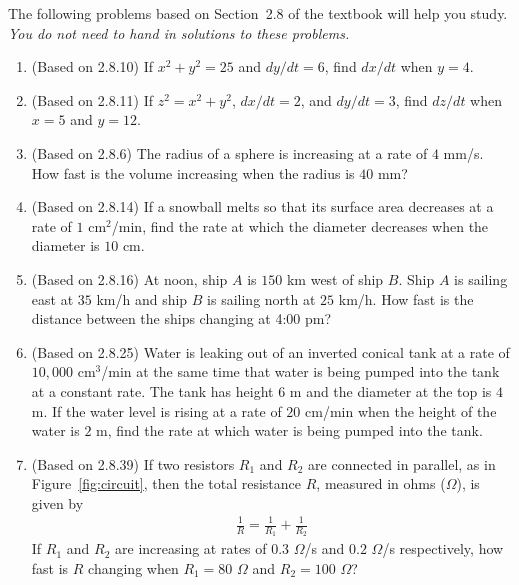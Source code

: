 \documentclass{article}
\title{\commonPSTitleZeroTwoEight}
\author{\commonAuthor}
\date{\commonDateZeroTwoEight}
\begin{document}
\maketitle
\thispagestyle{empty}

\noindent
The following problems based on Section~2.8 of the textbook will help
you study.  \emph{You do not need to hand in solutions to these
  problems.}
\begin{enumerate}
\item (Based on 2.8.10) %
  If $x^2+y^2=25$ and $dy/dt=6$, find $dx/dt$ when $y=4$.
\item (Based on 2.8.11) %
  If $z^2=x^2+y^2$, $dx/dt=2$, and $dy/dt=3$, find
  $dz/dt$ when $x=5$ and $y=12$.
\item (Based on 2.8.6) %
  The radius of a sphere is increasing at a rate of $4$
  mm/s.  How fast is the volume increasing when the radius is $40$ mm?
\item (Based on 2.8.14) %
  If a snowball melts so that its surface area
  decreases at a rate of $1$ cm$^2$/min, find the rate at which the
  diameter decreases when the diameter is $10$ cm.
\item (Based on 2.8.16) %
  At noon, ship $A$ is $150$ km west of ship $B$.
  Ship $A$ is sailing east at $35$ km/h and ship $B$ is sailing north at 
  $25$ km/h.  How fast is the distance between the ships changing at
  4:00 pm?
\item (Based on 2.8.25) %
  Water is leaking out of an inverted conical tank
  at a rate of $10,000$ cm$^3$/min at the same time that water is being
  pumped into the tank at a constant rate.  The tank has height $6$ m
  and the diameter at the top is $4$ m.  If the water level is rising at
  a rate of $20$ cm/min when the height of the water is $2$ m, find the
  rate at which water is being pumped into the tank.
\item (Based on 2.8.39)\label{prob:circuit} %
  If two resistors $R_1$ and $R_2$ are connected in parallel, as in
  Figure~\ref{fig:circuit}, then the total resistance $R$, measured in
  ohms ($\Omega$), is given by
  \begin{align*}
    \frac{1}{R} = \frac{1}{R_1} + \frac{1}{R_2}
  \end{align*}
  If $R_1$ and $R_2$ are increasing at rates of $0.3$ $\Omega$/s and
  $0.2$ $\Omega$/s respectively, how fast is $R$ changing when
  $R_1=80$ $\Omega$ and $R_2=100$ $\Omega$?
  \begin{figure}[htbp]
    \centering
    \begin{circuitikz}

\end{circuitikz}
\end{figure}
\end{enumerate}
\end{document}
